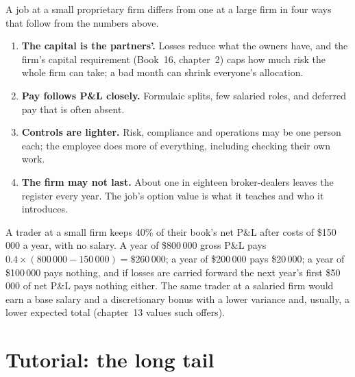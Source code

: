 A job at a small proprietary firm differs from one at a large firm in four ways that follow from the numbers above.
\begin{enumerate}
\item \textbf{The capital is the partners'.} Losses reduce what the owners have, and the firm's capital requirement
(Book~16, chapter~2) caps how much risk the whole firm can take; a bad month can shrink everyone's allocation.
\item \textbf{Pay follows P\&L closely.} Formulaic splits, few salaried roles, and deferred pay that is often absent.
\item \textbf{Controls are lighter.} Risk, compliance and operations may be one person each; the employee does more of
everything, including checking their own work.
\item \textbf{The firm may not last.} About one in eighteen broker-dealers leaves the register every year. The job's option value is what it teaches and who it introduces.
\end{enumerate}

\begin{example}\label{ex:in:medium-frequency-proprietary-shops:split}
A trader at a small firm keeps 40\% of their book's net P\&L after costs of \$150\,000 a year, with no salary. A year of
\$800\,000 gross P\&L pays $0.4\times(800\,000-150\,000)=\$260\,000$; a year of \$200\,000 pays \$20\,000; a year of
\$100\,000 pays nothing, and if losses are carried forward the next year's first \$50\,000 of net P\&L pays nothing either.
The same trader at a salaried firm would earn a base salary and a discretionary bonus with a lower variance and, usually,
a lower expected total (chapter~13 values such offers).
\end{example}

\section{Tutorial: the long tail}\label{tut:in:medium-frequency-proprietary-shops:tut}

